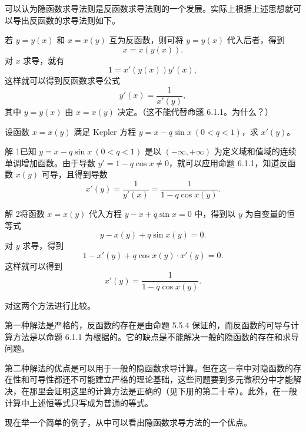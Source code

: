 可以认为隐函数求导法则是反函数求导法则的一个发展。实际上根据上述思想就可以导出反函数的求导法则如下。

若 $y=y(x)$ 和 $x=x(y)$ 互为反函数，则可将 $y=y(x)$ 代入后者，得到
\[
  x=x(y(x)).
\]
对 $x$ 求导，就有
\[
  1=x'(y(x))y'(x),
\]
这样就可以得到反函数求导公式
\[
  y'(x)=\frac1{x'(y)},
\]
其中 $y=y(x)$ 由 $x=x(y)$ 决定。（这不能代替命题 6.1.1。为什么？）

\begin{xexample}[6.2.6]
设函数 $x=x(y)$ 满足 Kepler 方程 $y=x-q\sin x\ (0<q<1)$，求 $x'(y)$。
\end{xexample}
\begin{xsolution}
解 1\quad 已知 $y=x-q\sin x\ (0<q<1)$ 是以 $(-\infty,+\infty)$ 为定义域和值域的连续单调增加函数。由于导数 $y'=1-q\cos x\ne0$，就可以应用命题 6.1.1，知道反函数 $x(y)$ 可导，且得到导数
\[
  x'(y)=\frac1{y'(x)}=\frac1{1-q\cos x(y)}.
\]

解 2\quad 将函数 $x=x(y)$ 代入方程 $y-x+q\sin x=0$ 中，得到以 $y$ 为自变量的恒等式
\[
  y-x(y)+q\sin x(y)=0.
\]
对 $y$ 求导，得到
\[
  1-x'(y)+q\cos x(y)\cdot x'(y)=0.
\]
这样就可以得到
\[
  x'(y)=\frac1{1-q\cos x(y)}.
\]
\end{xsolution}

\begin{xremark}
对这两个方法进行比较。

第一种解法是严格的，反函数的存在是由命题 5.5.4 保证的，而反函数的可导与计算方法是以命题 6.1.1 为根据的。它的缺点是不能解决一般的隐函数的存在和求导问题。

第二种解法的优点是可以用于一般的隐函数求导计算。但在这一章中对隐函数的存在性和可导性都还不可能建立严格的理论基础，这些问题要到多元微积分中才能解决，在那里会证明这里的计算方法是正确的（见下册的第二十章）。此外，在一般计算中上述恒等式只写成为普通的等式。

现在举一个简单的例子，从中可以看出隐函数求导方法的一个优点。
\end{xremark}

